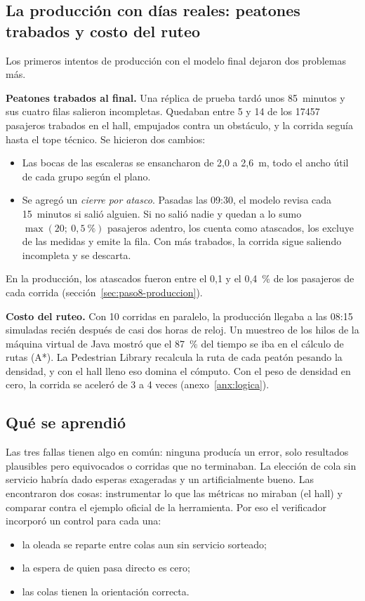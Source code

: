 \subsection{La producción con días reales: peatones trabados y costo del ruteo}
\label{anx:pilotos-produccion}

Los primeros intentos de producción con el modelo final dejaron dos problemas más.

\textbf{Peatones trabados al final.} Una réplica de prueba tardó unos 85~minutos y sus cuatro filas salieron
incompletas. Quedaban entre 5 y 14 de los \num{17457} pasajeros trabados en el hall, empujados contra un
obstáculo, y la corrida seguía hasta el tope técnico. Se hicieron dos cambios:
\begin{itemize}
  \item Las bocas de las escaleras se ensancharon de 2,0 a 2,6~m, todo el ancho útil de cada grupo según el plano.
  \item Se agregó un \emph{cierre por atasco}. Pasadas las 09:30, el modelo revisa cada 15~minutos si salió
        alguien. Si no salió nadie y quedan a lo sumo $\max(20;\ 0{,}5~\%)$ pasajeros adentro, los cuenta como
        atascados, los excluye de las medidas y emite la fila. Con más trabados, la corrida sigue saliendo
        incompleta y se descarta.
\end{itemize}
En la producción, los atascados fueron entre el 0,1 y el 0,4~\% de los pasajeros de cada corrida
(sección~\ref{sec:paso8-produccion}).

\textbf{Costo del ruteo.} Con 10 corridas en paralelo, la producción llegaba a las 08:15 simuladas recién
después de casi dos horas de reloj. Un muestreo de los hilos de la máquina virtual de Java mostró que el 87~\%
del tiempo se iba en el cálculo de rutas (A*). La Pedestrian Library recalcula la ruta de cada peatón pesando la
densidad, y con el hall lleno eso domina el cómputo. Con el peso de densidad en cero, la corrida se aceleró de
3 a 4 veces (anexo~\ref{anx:logica}).

\subsection{Qué se aprendió}

Las tres fallas tienen algo en común: ninguna producía un error, solo resultados plausibles pero
equivocados o corridas que no terminaban. La elección de cola sin servicio habría dado esperas exageradas
y un \EI{} artificialmente bueno. Las encontraron dos cosas: instrumentar lo que las métricas no miraban
(el hall) y comparar contra el ejemplo oficial de la herramienta. Por eso el verificador incorporó un
control para cada una:
\begin{itemize}
  \item la oleada se reparte entre colas aun sin servicio sorteado;
  \item la espera de quien pasa directo es cero;
  \item las colas tienen la orientación correcta.
\end{itemize}
